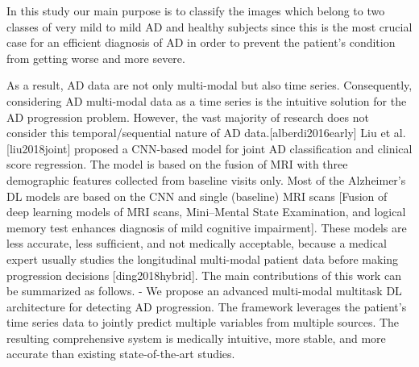 In this study our main purpose is to classify the images which belong to two classes of very mild to mild AD and healthy subjects since this is the most crucial case for an efficient diagnosis of AD in order to prevent the patient’s condition from getting worse and more severe.

As a result, AD data are not only multi-modal but also time series. Consequently, considering AD multi-modal data as a time series is the intuitive solution for the AD progression problem. However, the vast majority of research does not consider this temporal/sequential nature of AD data.[alberdi2016early]
Liu et al. [liu2018joint] proposed a CNN-based model for joint AD classiﬁcation and clinical score regression. The model is based on the fusion of MRI with three demographic features collected from baseline visits only. Most of the Alzheimer’s DL models are based on the CNN and single (baseline) MRI scans [Fusion of deep learning models of MRI scans, Mini–Mental State Examination, and logical memory test enhances diagnosis of mild cognitive impairment]. These models are less accurate, less sufﬁcient, and not medically acceptable, because a medical expert usually studies the longitudinal multi-modal patient data before making progression decisions [ding2018hybrid].
The main contributions of this work can be summarized as follows.
- We propose an advanced multi-modal multitask DL architecture for detecting AD progression. The framework leverages the patient’s time series data to jointly predict multiple variables from multiple sources. The resulting comprehensive system is medically intuitive, more stable, and more accurate than existing state-of-the-art studies.


